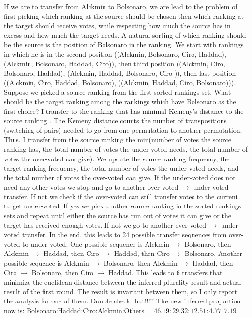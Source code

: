\documentclass[hidelinks,11pt]{article}
\begin{document}
If we are to transfer from Alckmin to Bolsonaro, we are lead to the problem of
first picking which ranking at the source should be chosen then which ranking at
the target should receive votes, while respecting how much the source has in
excess and how much the target needs. A natural sorting of which ranking should
be the source is the position of Bolsonaro in the ranking. We start with
rankings in which he is in the second position ((Alckmin, Bolsonaro, Ciro,
Haddad), (Alckmin, Bolsonaro, Haddad, Ciro)), then third position ((Alckmin,
Ciro, Bolsonaro, Haddad), (Alckmin, Haddad, Bolsonaro, Ciro )), then last
position ((Alckmin, Ciro, Haddad, Bolsonaro), ((Alckmin, Haddad, Ciro,
Bolsonaro))). Suppose we picked a source ranking from the first sorted rankings
set. What should be the target ranking among the rankings which have Bolsonaro
as the first choice? I transfer to the ranking that has minimal Kemeny's
distance to the source ranking \parencite{nurmi2002voting}. The Kemeny distance
counts the number of transpositions (switching of pairs) needed to go from one
permutation to another permutation. Thus, I transfer from the source ranking
the min(number of votes the source ranking has, the total number of votes the
under-voted needs, the total number of votes the over-voted can give). We update
the source ranking frequency, the target ranking frequency, the total number of
votes the under-voted needs, and the total number of votes the over-voted can
give. If the under-voted does not need any other votes we stop and go to another
over-voted \(\to\) under-voted transfer. If not we check if the over-voted can
still transfer votes to the current target under-voted. If yes we pick another
source ranking in the sorted rankings sets and repeat until either the source
has run out of votes it can give or the target has received enough votes. If not
we go to another over-voted \(\to\) under-voted transfer. In the end, this leads
to 24 possible transfer sequences from over-voted to under-voted. One possible
sequence is Alckmin \(\to\) Bolsonaro, then Alckmin \(\to\) Haddad, then Ciro
\(\to\) Haddad, then Ciro \(\to\) Bolsonaro. Another possible sequence is
Alckmin \(\to\) Bolsonaro, then Alckmin \(\to\) Haddad, then Ciro \(\to\)
Bolsonaro, then Ciro \(\to\) Haddad. This leads to 6 transfers that minimize the
euclidean distance between the inferred plurality result and actual result of
the first round. The result is invariant between them, so I only report the analysis for one of them.
\Big{\textcolor{red}{TODO}} Double check that!!!!!
The new inferred proportion now is:
Bolsonaro:Haddad:Ciro:Alckmin:Others = \(46.19:29.32:12.51:4.77:7.19 \).
\end{document}
